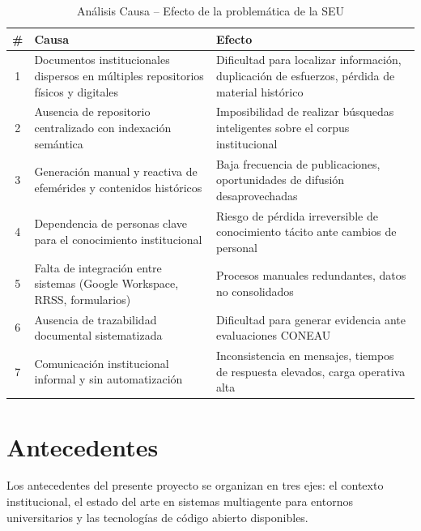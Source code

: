 \documentclass[a4paper, 12pt]{article}
\begin{document}
\begin{table}[htbp]
  \centering
  \caption{An\'alisis Causa -- Efecto de la problem\'atica de la SEU}
  \label{tab:causa-efecto}
  \begin{tabularx}{\textwidth}{c>{\raggedright\arraybackslash}X>{\raggedright\arraybackslash}X}
    \toprule
    \textbf{\#} & \textbf{Causa} & \textbf{Efecto} \\
    \midrule
    1 & Documentos institucionales dispersos en m\'ultiples repositorios f\'isicos y digitales & Dificultad para localizar informaci\'on, duplicaci\'on de esfuerzos, p\'erdida de material hist\'orico \\
    2 & Ausencia de repositorio centralizado con indexaci\'on sem\'antica & Imposibilidad de realizar b\'usquedas inteligentes sobre el corpus institucional \\
    3 & Generaci\'on manual y reactiva de efem\'erides y contenidos hist\'oricos & Baja frecuencia de publicaciones, oportunidades de difusi\'on desaprovechadas \\
    4 & Dependencia de personas clave para el conocimiento institucional & Riesgo de p\'erdida irreversible de conocimiento t\'acito ante cambios de personal \\
    5 & Falta de integraci\'on entre sistemas (Google Workspace, RRSS, formularios) & Procesos manuales redundantes, datos no consolidados \\
    6 & Ausencia de trazabilidad documental sistematizada & Dificultad para generar evidencia ante evaluaciones CONEAU \\
    7 & Comunicaci\'on institucional informal y sin automatizaci\'on & Inconsistencia en mensajes, tiempos de respuesta elevados, carga operativa alta \\
    \bottomrule
  \end{tabularx}
\end{table}

\section{Antecedentes}

Los antecedentes del presente proyecto se organizan en tres ejes: el contexto institucional, el estado del arte en sistemas multiagente para entornos universitarios y las tecnolog\'ias de c\'odigo abierto disponibles.
\end{document}
